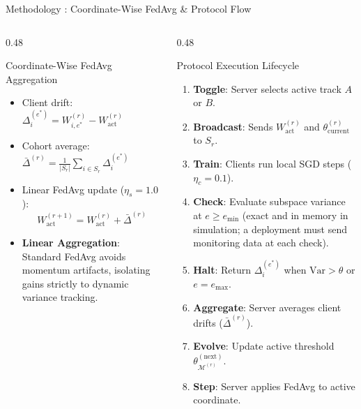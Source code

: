 \documentclass[aspectratio=169]{beamer}
\begin{document}
\begin{frame}{Methodology : Coordinate-Wise FedAvg \& Protocol Flow}
    \vspace{-0.4em}
    \begin{columns}
        \begin{column}{0.48\textwidth}
            \begin{block}{Coordinate-Wise FedAvg Aggregation}
                \begin{itemize}
                    \footnotesize
                    \item Client drift: $\Delta_i^{(e^*)} = W_{i, e^*}^{(r)} - W_{\text{act}}^{(r)}$
                    \item Cohort average: $\bar{\Delta}^{(r)} = \frac{1}{|S_r|}\sum_{i \in S_r} \Delta_i^{(e^*)}$
                    \item Linear FedAvg update ($\eta_s = 1.0$):
                    $$W_{\text{act}}^{(r+1)} = W_{\text{act}}^{(r)} + \bar{\Delta}^{(r)}$$
                    \item \textbf{Linear Aggregation}: Standard FedAvg avoids momentum artifacts, isolating gains strictly to dynamic variance tracking.
                \end{itemize}
            \end{block}
        \end{column}
        \begin{column}{0.48\textwidth}
            \begin{block}{Protocol Execution Lifecycle}
                \begin{enumerate}
                    \footnotesize
                    \item \textbf{Toggle}: Server selects active track $A$ or $B$.
                    \item \textbf{Broadcast}: Sends $W_{\text{act}}^{(r)}$ and $\theta_{\text{current}}^{(r)}$ to $S_r$.
                    \item \textbf{Train}: Clients run local SGD steps ($\eta_c = 0.1$).
                    \item \textbf{Check}: Evaluate subspace variance at $e \ge e_{\min}$ (exact and in memory in simulation; a deployment must send monitoring data at each check).
                    \item \textbf{Halt}: Return $\Delta_i^{(e^*)}$ when $\text{Var} > \theta$ or $e = e_{\max}$.
                    \item \textbf{Aggregate}: Server averages client drifts ($\bar{\Delta}^{(r)}$).
                    \item \textbf{Evolve}: Update active threshold $\theta_{\mathcal{M}^{(r)}}^{(\text{next})}$.
                    \item \textbf{Step}: Server applies FedAvg to active coordinate.
                \end{enumerate}
            \end{block}
        \end{column}
    \end{columns}
\end{frame}
\end{document}
